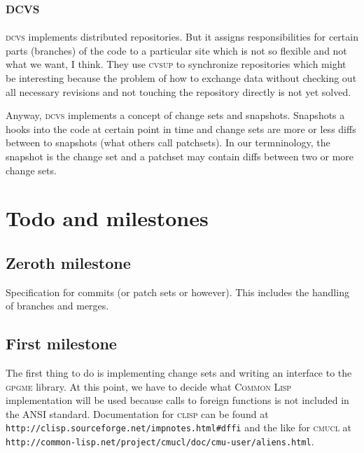 \documentclass[fleqn, 10pt, a4paper]{article}
\begin{document}
\subsection{\textsc{dcvs}}

\textsc{dcvs} implements distributed repositories. But it assigns
responsibilities for certain parts (branches) of the code to
a particular site which is not so flexible and not what we want, I think.
They use \textsc{cvsup} to synchronize repositories which might be
interesting because the problem of how to exchange data without checking
out all necessary revisions and not touching the repository directly is
not yet solved.
 
Anyway, \textsc{dcvs} implements a concept of change sets and snapshots.
Snapshots a hooks into the code at certain point in time and change sets
are more or less diffs between to snapshots (what others call patchsets).
In our termninology, the snapshot is the change set and a patchset may
contain diffs between two or more change sets.


\section{Todo and milestones}

\subsection{Zeroth milestone}
Specification for commits (or patch sets or however). This includes
the handling of branches and merges.

\subsection{First milestone}
The first thing to do is implementing change sets and writing an
interface to the \textsc{gpgme} library. At this point, we have to decide
what \textsc{Common Lisp} implementation will be used because calls
to foreign functions is not included in the ANSI standard.
Documentation for \textsc{clisp} can be found at
\texttt{http://clisp.sourceforge.net/impnotes.html\#dffi} and the like
for \textsc{cmucl} at \texttt{http://common-lisp.net/project/cmucl/doc/cmu-user/aliens.html}.
\end{document}

